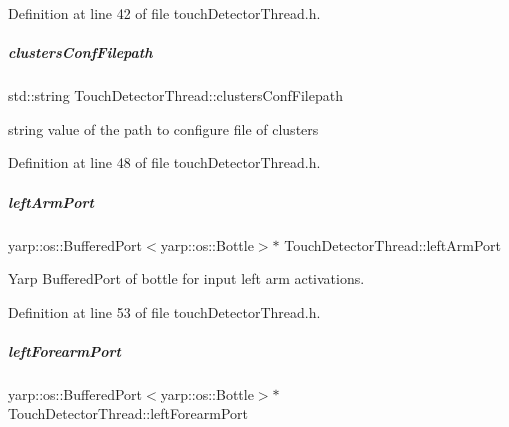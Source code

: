 Definition at line 42 of file touch\+Detector\+Thread.\+h.

\mbox{\label{group__touchDetector_af4ffe4e72ec3978af45f63f5f1721ff0}} 
\subparagraph{\texorpdfstring{clusters\+Conf\+Filepath}{clustersConfFilepath}}
{\footnotesize\ttfamily std\+::string Touch\+Detector\+Thread\+::clusters\+Conf\+Filepath\hspace{0.3cm}{\ttfamily [protected]}}



string value of the path to configure file of clusters 



Definition at line 48 of file touch\+Detector\+Thread.\+h.

\mbox{\label{group__touchDetector_a975fc42c10d903e8006cb49800bf9589}} 
\subparagraph{\texorpdfstring{left\+Arm\+Port}{leftArmPort}}
{\footnotesize\ttfamily yarp\+::os\+::\+Buffered\+Port$<$yarp\+::os\+::\+Bottle$>$$\ast$ Touch\+Detector\+Thread\+::left\+Arm\+Port\hspace{0.3cm}{\ttfamily [protected]}}



Yarp Buffered\+Port of bottle for input left arm activations. 



Definition at line 53 of file touch\+Detector\+Thread.\+h.

\mbox{\label{group__touchDetector_ac34d0d0c972146971c59c9150b2fcbc4}} 
\subparagraph{\texorpdfstring{left\+Forearm\+Port}{leftForearmPort}}
{\footnotesize\ttfamily yarp\+::os\+::\+Buffered\+Port$<$yarp\+::os\+::\+Bottle$>$$\ast$ Touch\+Detector\+Thread\+::left\+Forearm\+Port\hspace{0.3cm}{\ttfamily [protected]}}



